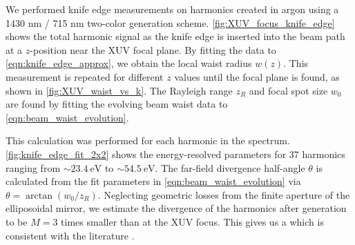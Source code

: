 We performed knife edge measurements on harmonics created in argon using a 1430 nm / 715 nm two-color generation scheme. \cref{fig:XUV_focus_knife_edge} shows the total harmonic signal as the knife edge is inserted into the beam path at a $z$-position near the XUV focal plane. By fitting the data to \cref{eqn:knife_edge_approx}, we obtain the local waist radius $w(z)$. This measurement is repeated for different $z$ values until the focal plane is found, as shown in \cref{fig:XUV_waist_vs_k}. The Rayleigh range $z_R$ and focal spot size $w_0$ are found by fitting the evolving beam waist data to \cref{eqn:beam_waist_evolution}.


This calculation was performed for each harmonic in the spectrum. \cref{fig:knife_edge_fit_2x2} shows the energy-resolved parameters for 37 harmonics ranging from $\sim 23.4 \ \textrm{eV}$ to $\sim 54.5 \ \textrm{eV}$. The far-field divergence half-angle $\theta$ is calculated from the fit parameters in \cref{eqn:beam_waist_evolution} via $\theta = \arctan(w_0 / z_R)$. Neglecting geometric losses from the finite aperture of the elliposoidal mirror, we estimate the divergence of the harmonics after generation to be $M = 3$ times smaller than at the XUV focus. This gives us a which is consistent with the literature \cite{tischAngularlyResolvedHighorder1994}.


